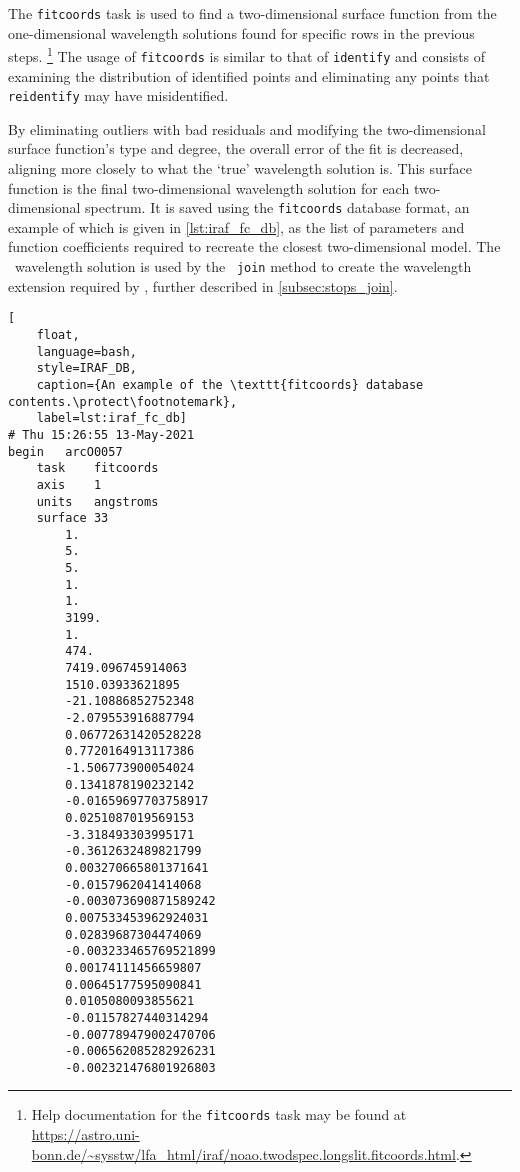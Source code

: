 The \texttt{fitcoords} task is used to find a two-dimensional surface function from the one-dimensional wavelength solutions found for specific rows in the previous steps.%
\footnote{Help documentation for the \texttt{fitcoords} task may be found at \url{https://astro.uni-bonn.de/~sysstw/lfa_html/iraf/noao.twodspec.longslit.fitcoords.html}.}
The usage of \texttt{fitcoords} is similar to that of \texttt{identify} and consists of examining the distribution of identified points and eliminating any points that \texttt{reidentify} may have misidentified.

By eliminating outliers with bad residuals and modifying the two-dimensional surface function's type and degree, the overall error of the fit is decreased, aligning more closely to what the `true' wavelength solution is.
This surface function is the final two-dimensional wavelength solution for each two-dimensional spectrum. It is saved using the \texttt{fitcoords} database format, an example of which is given in \autoref{lst:iraf_fc_db}, as the list of parameters and function coefficients required to recreate the closest two-dimensional model. The \iraf\ wavelength solution is used by the \stops\ \texttt{join} method to create the wavelength extension required by \polsalt, further described in \autoref{subsec:stops_join}.

\begin{lstlisting}[
    float,
    language=bash,
    style=IRAF_DB,
    caption={An example of the \texttt{fitcoords} database contents.\protect\footnotemark},
    label=lst:iraf_fc_db]
# Thu 15:26:55 13-May-2021
begin	arcO0057
	task	fitcoords
	axis	1
	units	angstroms
	surface	33
		1.
		5.
		5.
		1.
		1.
		3199.
		1.
		474.
		7419.096745914063
		1510.03933621895
		-21.10886852752348
		-2.079553916887794
		0.06772631420528228
		0.7720164913117386
		-1.506773900054024
		0.1341878190232142
		-0.01659697703758917
		0.0251087019569153
		-3.318493303995171
		-0.3612632489821799
		0.003270665801371641
		-0.0157962041414068
		-0.003073690871589242
		0.007533453962924031
		0.02839687304474069
		-0.003233465769521899
		0.00174111456659807
		0.00645177595090841
		0.0105080093855621
		-0.01157827440314294
		-0.007789479002470706
		-0.006562085282926231
		-0.002321476801926803

\end{lstlisting}

